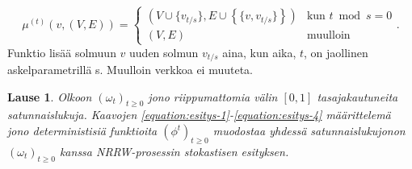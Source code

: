 \documentclass[finnish, 12pt, a4paper, sci, utf8, pdfa]{aaltothesis}
\newtheorem{theorem}{Lause}
\begin{document}
\begin{equation}
   \mu^{(t)} \left( v, (V, E) \right) =
   \begin{cases}
      \left( V \cup \{v_{t/s}\}, E \cup \left\{ \{ v, v_{t/s} \} \right\} \right) & \text{kun } t \bmod s = 0 \\
      \left( V, E \right) & \text{muulloin}
   \end{cases}.
   \label{equation:esitys-4}
\end{equation}
Funktio lisää solmuun \( v \) uuden solmun \( v_{t/s} \) aina, kun aika, $ t $, on jaollinen askelparametrillä s. Muulloin verkkoa ei muuteta.

\begin{theorem}
Olkoon $ (\omega_{t})_{t \geq 0} $ jono riippumattomia välin $ [0, 1] $ tasajakautuneita satunnaislukuja. Kaavojen \ref{equation:esitys-1}-\ref{equation:esitys-4} määrittelemä jono deterministisiä funktioita $ (\phi^{t})_{t \geq 0} $ muodostaa yhdessä satunnaislukujonon $ (\omega_{t})_{t \geq 0} $ kanssa NRRW-prosessin stokastisen esityksen.
\label{theorem:my-theorem}
\end{theorem}
\end{document}

